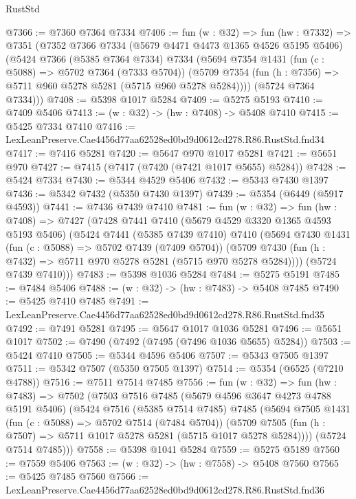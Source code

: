 \begin{lexlean}{RustStd}
\begin{coremodule}
@7366 := @7360 @7364 @7334
@7406 := fun (w : @32) =>
  fun (hw : @7332) =>
  @7351
    (@7352
      @7366
      @7334
      (@5679 @4471 @4473 @1365 @4526 @5195 @5406)
      (@5424
        @7366
        (@5385 @7364 @7334)
        @7334
        (@5694
          @7354
          @1431
          (fun (c : @5088) => @5702 @7364 (@7333 @5704))
          (@5709 @7354 (fun (h : @7356) => @5711 @960 @5278 @5281 (@5715 @960 @5278 @5284))))
        (@5724 @7364 @7334)))
@7408 := @5398 @1017 @5284
@7409 := @5275 @5193
@7410 := @7409 @5406
@7413 := (w : @32) -> (hw : @7408) -> @5408 @7410
@7415 := @5425 @7334 @7410
@7416 := LexLeanPreserve.Cae4456d77aa62528ed0bd9d0612cd278.R86.RustStd.fnd34
@7417 := @7416 @5281
@7420 := @5647 @970 @1017 @5281
@7421 := @5651 @970
@7427 := @7415 (@7417 (@7420 (@7421 @1017 @5655) @5284))
@7428 := @5424 @7334
@7430 := @5344 @4529 @5406
@7432 := @5343 @7430 @1397
@7436 := @5342 @7432 (@5350 @7430 @1397)
@7439 := @5354 (@6449 (@5917 @4593))
@7441 := @7436 @7439 @7410
@7481 := fun (w : @32) =>
  fun (hw : @7408) =>
  @7427
    (@7428
      @7441
      @7410
      (@5679 @4529 @3320 @1365 @4593 @5193 @5406)
      (@5424
        @7441
        (@5385 @7439 @7410)
        @7410
        (@5694
          @7430
          @1431
          (fun (c : @5088) => @5702 @7439 (@7409 @5704))
          (@5709 @7430 (fun (h : @7432) => @5711 @970 @5278 @5281 (@5715 @970 @5278 @5284))))
        (@5724 @7439 @7410)))
@7483 := @5398 @1036 @5284
@7484 := @5275 @5191
@7485 := @7484 @5406
@7488 := (w : @32) -> (hw : @7483) -> @5408 @7485
@7490 := @5425 @7410 @7485
@7491 := LexLeanPreserve.Cae4456d77aa62528ed0bd9d0612cd278.R86.RustStd.fnd35
@7492 := @7491 @5281
@7495 := @5647 @1017 @1036 @5281
@7496 := @5651 @1017
@7502 := @7490 (@7492 (@7495 (@7496 @1036 @5655) @5284))
@7503 := @5424 @7410
@7505 := @5344 @4596 @5406
@7507 := @5343 @7505 @1397
@7511 := @5342 @7507 (@5350 @7505 @1397)
@7514 := @5354 (@6525 (@7210 @4788))
@7516 := @7511 @7514 @7485
@7556 := fun (w : @32) =>
  fun (hw : @7483) =>
  @7502
    (@7503
      @7516
      @7485
      (@5679 @4596 @3647 @4273 @4788 @5191 @5406)
      (@5424
        @7516
        (@5385 @7514 @7485)
        @7485
        (@5694
          @7505
          @1431
          (fun (c : @5088) => @5702 @7514 (@7484 @5704))
          (@5709 @7505 (fun (h : @7507) => @5711 @1017 @5278 @5281 (@5715 @1017 @5278 @5284))))
        (@5724 @7514 @7485)))
@7558 := @5398 @1041 @5284
@7559 := @5275 @5189
@7560 := @7559 @5406
@7563 := (w : @32) -> (hw : @7558) -> @5408 @7560
@7565 := @5425 @7485 @7560
@7566 := LexLeanPreserve.Cae4456d77aa62528ed0bd9d0612cd278.R86.RustStd.fnd36

\end{coremodule}
\end{lexlean}
